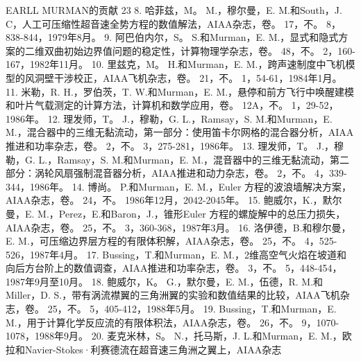 \documentclass[UTF8,11pt,a4paper,openany,fontset=fandol]{ctexbook}
\begin{document}
EARLL MURMAN的贡献 23 8. 哈菲兹，M。 M.，穆尔曼，E. M.和South，J. C，人工可压缩性超音速全势方程的数值解法，AIAA杂志，卷。 17，不。 8，838-844，1979年8月。 9. 阿巴伯内尔，S。 S.和Murman，E. M.，显式和隐式方案的二维双曲初始边界值问题的稳定性，计算物理学杂志，卷。 48，不。 2，160-167，1982年11月。 10. 里兹克，M。 H.和Murman，E. M.，跨声速制度中飞机模型的风洞壁干涉校正，AIAA飞机杂志，卷。 21，不。 1，54-61，1984年1月。 11. 米勒，R. H.，罗伯茨，T. W.和Murman，E. M.，悬停和前方飞行中唤醒建模和叶片气载测定的计算方法，计算机和数学应用，卷。 12A，不。 1，29-52，1986年。 12. 理发师，T。 J.，穆勒，G. L.，Ramsay，S. M.和Murman，E. M.，混合器中的三维无黏流动，第一部分：使用笛卡尔网格的混合器分析，AIAA推进和功率杂志，卷。 2，不。 3，275-281，1986年。 13. 理发师，T。 J.，穆勒，G. L.，Ramsay，S. M.和Murman，E. M.，混音器中的三维无黏流动，第二部分：涡轮风扇强制混音器分析，AIAA推进和动力杂志，卷。 2，不。 4，339-344，1986年。 14. 博尚。 P.和Murman，E. M.，Euler 方程的波浪墙解决方案，AIAA杂志，卷。 24，不。 1986年12月，2042-2045年。 15. 鲍威尔，K.，默尔曼，E. M.，Perez，E.和Baron，J.，锥形Euler 方程的螺旋解中的总压力损失，AIAA杂志，卷。 25，不。 3，360-368，1987年3月。 16. 洛伊德，B.和穆尔曼，E. M.，可压缩边界层方程的有限体积解，AIAA杂志，卷。 25，不。 4，525-526，1987年4月。 17. Bussing，T.和Murman，E. M.，2维高空气火焰在坡道和向后方台阶上的数值调查，AIAA推进和功率杂志，卷。 3，不。 5，448-454，1987年9月至10月。 18. 鲍威尔，K。 G.，默尔曼，E. M.，伍德，R. M.和Miller，D. S.，带有涡流襟翼的三角洲翼的实验和数值结果的比较，AIAA飞机杂志，卷。 25，不。 5，405-412，1988年5月。 19. Bussing，T.和Murman，E. M.，用于计算化学反应流的有限体积法，AIAA杂志，卷。 26，不。 9，1070-1078，1988年9月。 20. 麦克米林，S。 N.，托马斯，J. L.和Murman，E. M.，欧拉和Navier-Stokes·利赛德流在超音速三角洲之翼上，AIAA杂志
\end{document}
